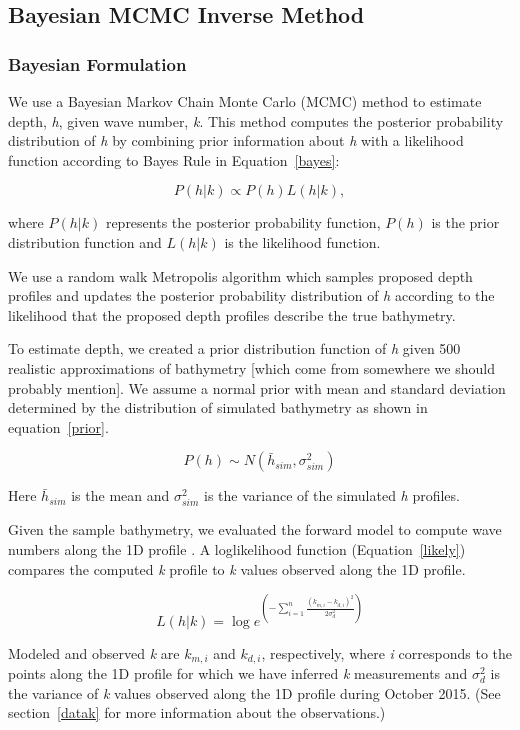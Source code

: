 \subsection{Bayesian MCMC Inverse Method}
\subsubsection{Bayesian Formulation}

We use a Bayesian Markov Chain Monte Carlo (MCMC) method to estimate depth, \textit{h}, given wave number, \textit{k}.%
This method computes the posterior probability distribution of \textit{h} by combining prior information about \textit{h} with a likelihood function according to Bayes Rule in Equation~\ref{bayes}: 

$$P(h|%
k) \propto P(h)L(h|%
k),$$ \label{bayes}

where $P(h|%
k)$ represents the posterior probability function, $P(h)$ is the prior distribution function and $L(h|%
k)$ is the likelihood function.

We use a random walk Metropolis algorithm \citep{Metropolis1953} which samples proposed depth profiles and updates the posterior probability distribution of \textit{h} according to the likelihood that the proposed depth profiles describe the true bathymetry. 

To estimate depth, we created a prior distribution function of \textit{h} given 500 realistic approximations of bathymetry [which come from somewhere we should probably mention].  We assume a normal prior with mean and standard deviation determined by the distribution of simulated bathymetry as shown in equation~\ref{prior}. 

$$P(h) \sim N(\bar{h}_{sim},\sigma_{sim}^2)$$

Here $\bar{h}_{sim}$ is the mean and $\sigma_{sim}^2$ is the variance of the simulated \textit{h} profiles. 

Given the sample bathymetry, we evaluated the forward model to compute wave numbers along the 1D profile%
. A loglikelihood function (Equation~\ref{likely}) compares the computed \textit{k} profile to \textit{k} values observed along the 1D profile. 

\[ L(h|%
k)=\log{e^{(-\sum\limits_{i=1}^n \frac{({k}_{m,i}-k_{d,i})^2}{2\sigma_{d}^2})}}\] \label{likely}

Modeled and observed \textit{k} are ${k}_{m,i}$ and $k_{d,i}$, respectively, where \textit{i} corresponds to the points along the 1D profile for which we have inferred \textit{k} measurements and $\sigma_{d}^2$ is the variance of \textit{k} values observed along the 1D profile during October 2015. (See section~\ref{datak} for more information about the observations.) 

